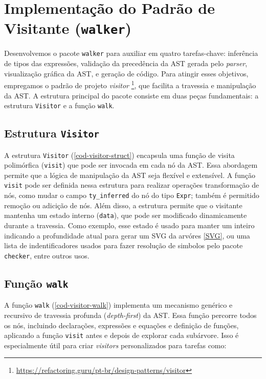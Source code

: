 
\section{Implementação do Padrão de Visitante (\texttt{walker})} \label{section-walker}


Desenvolvemos o pacote \texttt{walker} para auxiliar em quatro tarefas-chave: inferência de tipos das expressões, validação da precedência da AST gerada pelo \textit{parser}, visualização gráfica da AST, e geração de código. Para atingir esses objetivos, empregamos o padrão de projeto \textit{visitor} \footnote{\url{https://refactoring.guru/pt-br/design-patterns/visitor}}, que facilita a travessia e manipulação da AST. A estrutura principal do pacote consiste em duas peças fundamentais: a estrutura \texttt{Visitor} e a função \texttt{walk}.

\subsection{Estrutura \texttt{Visitor}}

A estrutura \texttt{Visitor} (\autoref{cod-visitor-struct}) encapsula uma função de visita polimórfica (\texttt{visit}) que pode ser invocada em cada nó da AST. Essa abordagem permite que a lógica de manipulação da AST seja flexível e extensível. A função \texttt{visit} pode ser definida nessa estrutura para realizar operações transformação de nós, como mudar o campo \texttt{ty\_inferred} do nó do tipo \texttt{Expr}; também é permitido remoção ou adicição de nós. Além disso, a estrutura permite que o visitante mantenha um estado interno (\texttt{data}), que pode ser modificado dinamicamente durante a travessia. Como exemplo, esse estado é usado para manter um inteiro indicando a profundidade atual para gerar um SVG da arvóres \autoref{SVG}, ou uma lista de indentificadores usados para fazer resolução de simbolos pelo pacote \texttt{checker}, entre outros usos.



\subsection{Função \texttt{walk}}
A função \texttt{walk} (\autoref{cod-visitor-walk}) implementa um mecanismo genérico e recursivo de travessia profunda (\textit{depth-first}) da AST. Essa função percorre todos os nós, incluindo declarações, expressões e equações e definição de funções, aplicando a função \texttt{visit} antes e depois de explorar cada subárvore. Isso é especialmente útil para criar \textit{visitors} personalizados para tarefas como:

